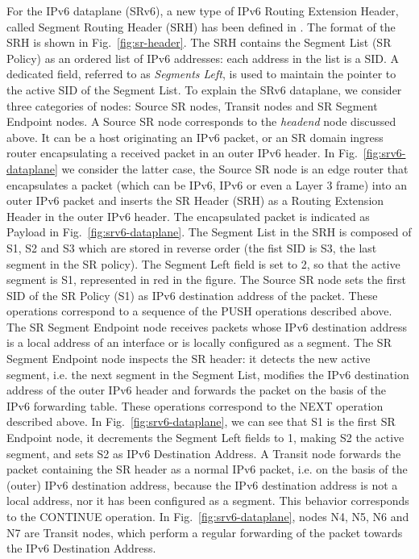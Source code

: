 For the IPv6 dataplane (SRv6), a new type of IPv6 Routing Extension Header, called Segment Routing Header (SRH) has been defined in \cite{draft-srh}. The format of the SRH is shown in Fig.~\ref{fig:sr-header}. The SRH contains the Segment List (SR Policy) as an ordered list of IPv6 addresses: each address in the list is a SID. A dedicated field, referred to as \textit{Segments Left}, is used to maintain the pointer to the active SID of the Segment List. To explain the SRv6 dataplane, we consider three categories of nodes: Source SR nodes, Transit nodes and SR Segment Endpoint nodes. A Source SR node corresponds to the \textit{headend} node discussed above. It can be a host originating an IPv6 packet, or an SR domain ingress router encapsulating a received packet in an outer IPv6 header. In Fig.~\ref{fig:srv6-dataplane} we consider the latter case, the Source SR node is an edge router that encapsulates a packet (which can be IPv6, IPv6 or even a Layer 3 frame) into an outer IPv6 packet and inserts the SR Header (SRH) as a Routing Extension Header in the outer IPv6 header. The encapsulated packet is indicated as Payload in Fig.~\ref{fig:srv6-dataplane}. The Segment List in the SRH is composed of S1, S2 and S3 which are stored in reverse order (the fist SID is S3, the last segment in the SR policy). The Segment Left field is set to 2, so that the active segment is S1, represented in red in the figure. The Source SR node sets the first SID of the SR Policy (S1) as IPv6 destination address of the packet. These operations correspond to a sequence of the PUSH operations described above. The SR Segment Endpoint node receives packets whose IPv6 destination address is a local address of an interface or is locally configured as a segment. The SR Segment Endpoint node inspects the SR header: it detects the new active segment, i.e. the next segment in the Segment List, modifies the IPv6 destination address of the outer IPv6 header and forwards the packet on the basis of the IPv6 forwarding table. These operations correspond to the NEXT operation described above. In Fig.~\ref{fig:srv6-dataplane}, we can see that S1 is the first SR Endpoint node, it decrements the Segment Left fields to 1, making S2 the active segment, and sets S2 as IPv6 Destination Address. A Transit node forwards the packet containing the SR header as a normal IPv6 packet, i.e. on the basis of the (outer) IPv6 destination address, because the IPv6 destination address is not a local address, nor it has been configured as a segment. This behavior corresponds to the CONTINUE operation. In Fig.~\ref{fig:srv6-dataplane}, nodes N4, N5, N6 and N7 are Transit nodes, which perform a regular forwarding of the packet towards the IPv6 Destination Address.

